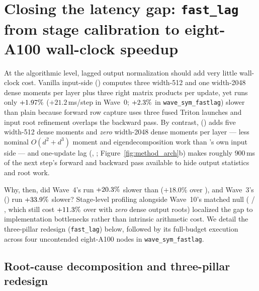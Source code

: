 \section{Closing the latency gap: \texttt{fast\_lag} from stage calibration to eight-A100 wall-clock speedup}
\label{sec:systems}

At the algorithmic level, lagged output normalization should add very little
wall-clock cost. Vanilla input-side  (\muont{}) computes three
width-512 and one width-2048 dense moments per layer plus three right matrix
products per update, yet runs only $+1.97\%$ ($+21.2$\,ms/step in
Wave~0; $+2.3\%$ in \texttt{wave\_sym\_fastlag}) slower than
plain  because forward row capture uses three fused Triton launches
and input root refinement overlaps the backward pass. By contrast,
 (\mlpdiag{}) adds five width-512 dense moments and \emph{zero}
width-2048 dense moments per layer --- less nominal $O(d^2 + d^3)$ moment and
eigendecomposition work than 's own input side --- and one-update
lag (, ; Figure~\ref{fig:method_arch}b)
makes roughly $900$\,ms of the next step's forward and backward pass available
to hide output statistics and root work.

Why, then, did Wave~4's  run $+20.3\%$ slower
than  ($+18.0\%$ over ), and Wave~3's
 (\denselag{}) run $+33.9\%$ slower?
Stage-level profiling alongside Wave~10's matched null ( /
\nullod{}, which still cost $+11.3\%$ over  with
\emph{zero} dense output roots) localized the gap to implementation bottlenecks
rather than intrinsic arithmetic cost. We detail the three-pillar redesign
(\texttt{fast\_lag}) below, followed by its full-budget execution across four
uncontended eight-A100 nodes in \texttt{wave\_sym\_fastlag}.

\subsection{Root-cause decomposition and three-pillar redesign}
\label{sec:systems-pillars}

